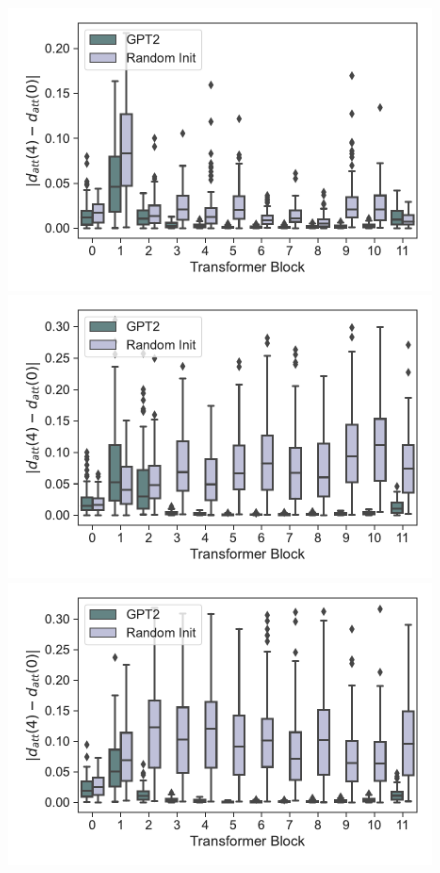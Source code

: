 \begin{figure}[h]
    \centering
    \begin{minipage}[b]{0.32\linewidth}
        \includegraphics[width=\linewidth]{figs/att_dist_diff_0_4_gpt2_dt_hopper_medium_666_K1.pdf}
    \end{minipage}
    \begin{minipage}[b]{0.32\linewidth}
        \includegraphics[width=\linewidth]{figs/att_dist_diff_0_4_gpt2_dt_halfcheetah_medium_666_K1.pdf}
    \end{minipage}
    \begin{minipage}[b]{0.32\linewidth}
        \includegraphics[width=\linewidth]{figs/att_dist_diff_0_4_gpt2_dt_walker2d_medium_666_K1.pdf}

\end{minipage}
\end{figure}
